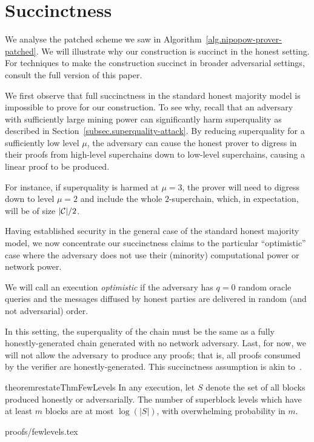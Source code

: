 \section{Succinctness}
\label{sec.succinctness}

We analyse the patched scheme we saw in
Algorithm~\ref{alg.nipopow-prover-patched}. We will illustrate why our
construction is succinct in the honest setting. For techniques to make the
construction succinct in broader adversarial settings, consult the
full version of this paper.

We first observe that full succinctness in the standard honest majority model is
impossible to prove for our construction. To see why, recall that an adversary
with sufficiently large mining power can significantly harm superquality as
described in Section~\ref{subsec.superquality-attack}. By reducing superquality
for a sufficiently low level $\mu$, the adversary can cause the honest prover to
digress in their proofs from high-level superchains down to low-level
superchains, causing a linear proof to be produced.

For instance, if superquality is harmed at $\mu = 3$, the prover will
need to digress down to level $\mu = 2$ and include the whole $2$-superchain,
which, in expectation, will be of size $|\mathcal{C}|/2$.

Having established security in the general case of the standard honest majority
model, we now concentrate our succinctness claims to the particular
``optimistic'' case where the adversary does not use their (minority)
computational power or network power.

\begin{definition}
  We will call an execution \emph{optimistic} if the adversary has $q = 0$
  random oracle queries and the messages diffused by honest parties are
  delivered in random (and not adversarial) order.
\end{definition}

In this setting, the superquality of the chain must be the same as a fully
honestly-generated chain generated with no network adversary. Last, for now, we
will not allow the adversary to produce any proofs; that is, all proofs consumed
by the verifier are honestly-generated. This succinctness assumption is akin
to~\cite{KLS}.

\ifieee\else
  \begin{restatable}{theorem}{restateThmFewLevels}
      \label{thm.few-levels}
      In any execution, let $S$ denote the set of all blocks produced honestly or
      adversarially. The number of superblock levels which have at least $m$
      blocks are at most $\log(|S|)$, with overwhelming probability in $m$.
  \end{restatable}
  \ifonecolumn
  {proofs/fewlevels.tex}
  \fi

